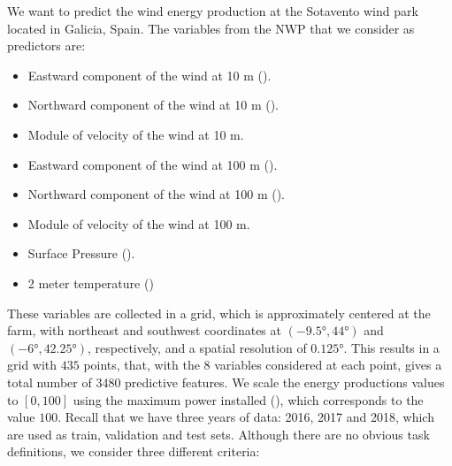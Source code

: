 We want to predict the wind energy production at the Sotavento wind park located in Galicia, Spain. The variables from the NWP that we consider as predictors are:
\begin{itemize}
    \item	Eastward component of the wind at {10 m} %
     ().
    \item	Northward  component of the wind at {10 m} ().
    \item   Module of velocity of the wind at 10 m.
    \item	Eastward  component of the wind at {100 m} ().
    \item	Northward component of the wind at {100 m} ().
    \item   Module of velocity of the wind at 100 m.
    \item   Surface {Pressure} ().
    \item	2 meter {temperature} ()
\end{itemize}
These variables are collected in a grid, which is approximately centered at the farm, with northeast and southwest coordinates at $(\ang{-9.5}, \ang{44})$ and $(\ang{-6}, \ang{42.25})$, respectively, and a spatial resolution of $\ang{0.125}$.
This results in a grid with $435$ points, that, with the $8$ variables considered at each point, gives a total number of {3480} predictive features.
We scale the energy productions values to $[0, 100]$ using the maximum power installed (), which corresponds to the value $100$.
%
Recall that we have three years of data: 2016, 2017 and 2018, which are used as train, validation and test sets.
%
Although there are no obvious task definitions, we consider three different criteria:
